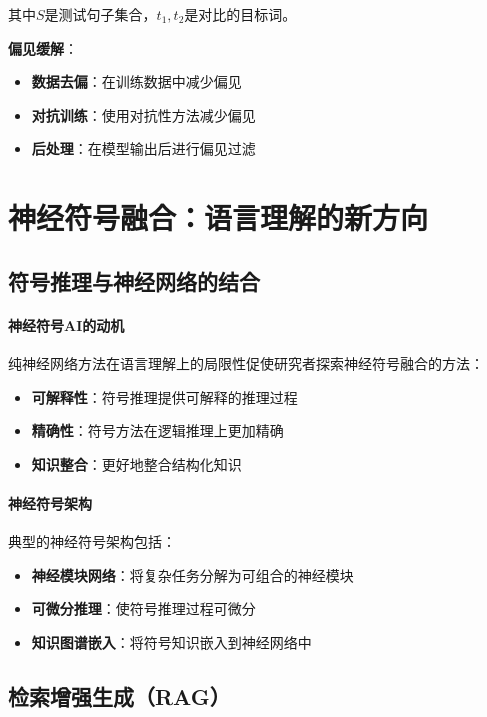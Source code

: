 其中$S$是测试句子集合，$t_1, t_2$是对比的目标词。

\textbf{偏见缓解}：
\begin{itemize}
\item \textbf{数据去偏}：在训练数据中减少偏见
\item \textbf{对抗训练}：使用对抗性方法减少偏见
\item \textbf{后处理}：在模型输出后进行偏见过滤
\end{itemize}

\section{神经符号融合：语言理解的新方向}

\subsection{符号推理与神经网络的结合}

\paragraph{神经符号AI的动机}
纯神经网络方法在语言理解上的局限性促使研究者探索神经符号融合的方法：

\begin{itemize}
\item \textbf{可解释性}：符号推理提供可解释的推理过程
\item \textbf{精确性}：符号方法在逻辑推理上更加精确
\item \textbf{知识整合}：更好地整合结构化知识
\end{itemize}

\paragraph{神经符号架构}
典型的神经符号架构包括：

\begin{itemize}
\item \textbf{神经模块网络}：将复杂任务分解为可组合的神经模块
\item \textbf{可微分推理}：使符号推理过程可微分
\item \textbf{知识图谱嵌入}：将符号知识嵌入到神经网络中
\end{itemize}

\subsection{检索增强生成（RAG）}


